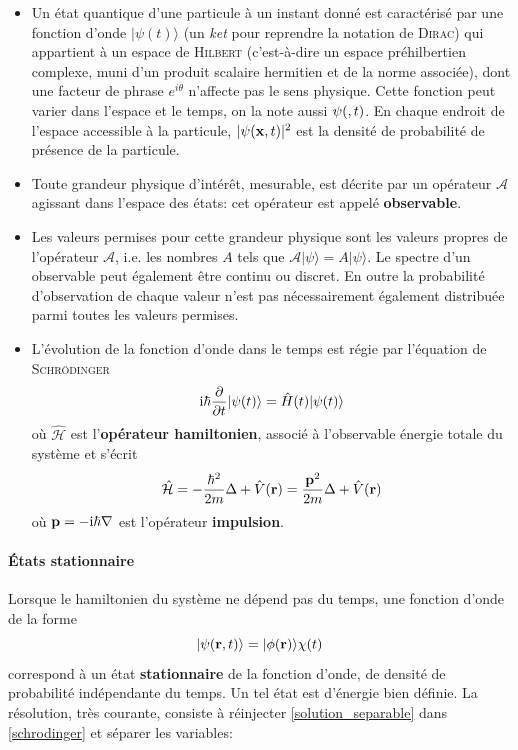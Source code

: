 \documentclass[svgnames,dvipsnames,a4paper,10pt,french]{report}
\begin{document}
\begin{itemize}
    \item Un état quantique d'une particule à un instant donné est caractérisé par une fonction d'onde $|\psi(t) \rangle$ (un \emph{ket} pour reprendre la notation de \textsc{Dirac}) qui appartient à un espace de \textsc{Hilbert}  (c'est-à-dire un espace préhilbertien complexe, muni d'un produit scalaire hermitien et de la norme associée), dont une facteur de phrase $e^{i\theta}$ n'affecte pas le sens physique. Cette fonction peut varier dans l'espace et le temps, on la note aussi $\psi(\mathbf{},t)$. En chaque endroit de l'espace accessible à la particule, $|\psi(\mathbf{x},t)|^2$ est la densité de probabilité de présence de la particule.
    \item Toute grandeur physique d'intérêt, mesurable, est décrite par un opérateur $\mathcal{A}$ agissant dans l'espace des états: cet opérateur est appelé \textbf{observable}.
    \item Les valeurs permises pour cette grandeur physique sont les valeurs propres de l'opérateur $\mathcal{A}$, i.e. les nombres $A$ tels que $\mathcal{A}|\psi \rangle = A |\psi\rangle$. Le spectre d'un observable peut également être continu ou discret. En outre la probabilité d'observation de chaque valeur n'est pas nécessairement également distribuée parmi toutes les valeurs permises.
    \item L'évolution de la fonction d'onde dans le temps est régie par l'équation de \textsc{Schrödinger}
    \begin{equation}
    \label{schrodinger}
        \mathrm{i}\hbar \frac{\partial}{\partial t} |\psi(t) \rangle = \hat{H}(t) |\psi(t) \rangle
    \end{equation} où $\hat{\mathcal{H}}$ est l'\textbf{opérateur hamiltonien}, associé à l'observable énergie totale du système et s'écrit
    \begin{equation}
    \label{energie_totale_hamiltonien}
        \hat{\mathcal{H}} = -\frac{\hbar^2}{2m} \Delta + \hat{V}(\mathbf{r}) = \frac{\mathbf{p}^2}{2m} \Delta + \hat{V}(\mathbf{r})
    \end{equation} où $\mathbf{p} = -\mathrm{i}\hbar \mathbf{\nabla}$ est l'opérateur \textbf{impulsion}.
\end{itemize}  

\paragraph{États stationnaire}
Lorsque le hamiltonien du système ne dépend pas du temps, une fonction d'onde de la forme
\begin{equation}
\label{solution_separable}
    |\psi(\mathbf{r},t)\rangle = |\phi(\mathbf{r}) \rangle \chi (t) 
\end{equation}
correspond à un état \textbf{stationnaire} de la fonction d'onde, de densité de probabilité indépendante du temps. Un tel état est d'énergie bien définie. La résolution, très courante, consiste à réinjecter \ref{solution_separable} dans \ref{schrodinger} et séparer les variables:
 
\end{document}
